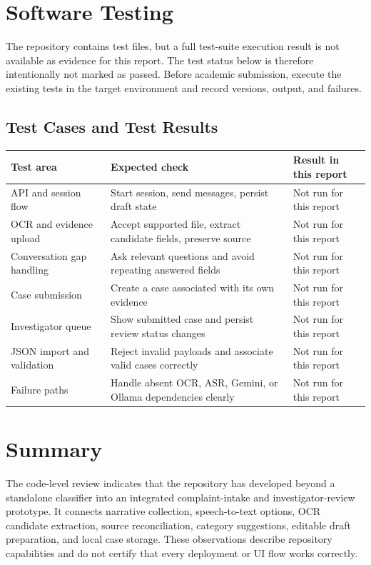 \documentclass[12pt,a4paper,oneside]{report}
\begin{document}
\section{Software Testing}
The repository contains test files, but a full test-suite execution result is not available as evidence for this report. The test status below is therefore intentionally not marked as passed. Before academic submission, execute the existing tests in the target environment and record versions, output, and failures.\par\medskip
\subsection{Test Cases and Test Results}
\begin{longtable}{|>{\RaggedRight\arraybackslash}p{}|>{\RaggedRight\arraybackslash}p{}|>{\RaggedRight\arraybackslash}p{}|}
\hline
\textbf{Test area} & \textbf{Expected check} & \textbf{Result in this report} \\\hline
API and session flow & Start session, send messages, persist draft state & Not run for this report \\\hline
OCR and evidence upload & Accept supported file, extract candidate fields, preserve source & Not run for this report \\\hline
Conversation gap handling & Ask relevant questions and avoid repeating answered fields & Not run for this report \\\hline
Case submission & Create a case associated with its own evidence & Not run for this report \\\hline
Investigator queue & Show submitted case and persist review status changes & Not run for this report \\\hline
JSON import and validation & Reject invalid payloads and associate valid cases correctly & Not run for this report \\\hline
Failure paths & Handle absent OCR, ASR, Gemini, or Ollama dependencies clearly & Not run for this report \\\hline
\end{longtable}
\vspace{2mm}
\section{Summary}
The code-level review indicates that the repository has developed beyond a standalone classifier into an integrated complaint-intake and investigator-review prototype. It connects narrative collection, speech-to-text options, OCR candidate extraction, source reconciliation, category suggestions, editable draft preparation, and local case storage. These observations describe repository capabilities and do not certify that every deployment or UI flow works correctly.\par\medskip
\end{document}
